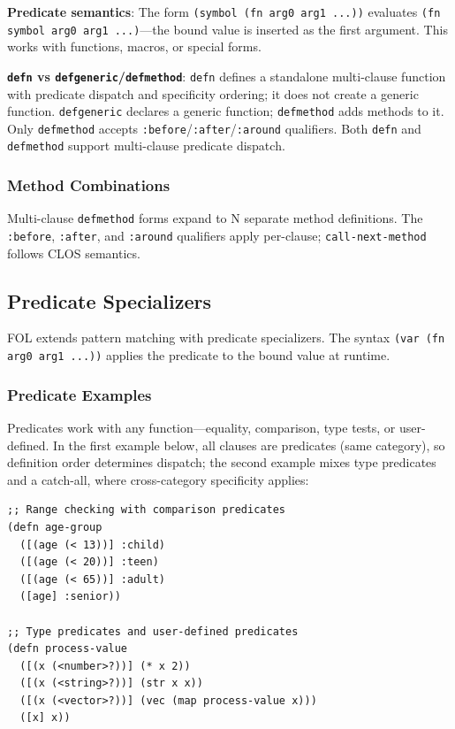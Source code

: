 \documentclass[sigconf,nonacm,review]{acmart}
\begin{document}
\textbf{Predicate semantics}: The form \texttt{(symbol (fn arg0 arg1 ...))} evaluates \texttt{(fn symbol arg0 arg1 ...)}---the bound value is inserted as the first argument. This works with functions, macros, or special forms.

\textbf{\texttt{defn} vs \texttt{defgeneric}/\texttt{defmethod}}: \texttt{defn} defines a standalone multi-clause function with predicate dispatch and specificity ordering; it does not create a generic function.
\texttt{defgeneric} declares a generic function; \texttt{defmethod} adds methods to it. Only \texttt{defmethod} accepts \texttt{:before}/\texttt{:after}/\texttt{:around} qualifiers. Both \texttt{defn} and \texttt{defmethod}
support multi-clause predicate dispatch.

\subsubsection{Method Combinations}

Multi-clause \texttt{defmethod} forms expand to N separate method definitions. The \texttt{:before}, \texttt{:after}, and \texttt{:around} qualifiers apply per-clause; \texttt{call-next-method} follows CLOS semantics.

\subsection{Predicate Specializers}

FOL extends pattern matching with predicate specializers. The syntax \texttt{(var (fn arg0 arg1 ...))} applies the predicate to the bound value at runtime.

\subsubsection{Predicate Examples}

Predicates work with any function---equality, comparison, type tests, or user-defined. In the first example below, all clauses are predicates (same category), so definition order determines dispatch; the second example
mixes type predicates and a catch-all, where cross-category specificity applies:

\begin{lstlisting}
;; Range checking with comparison predicates
(defn age-group
  ([(age (< 13))] :child)
  ([(age (< 20))] :teen)
  ([(age (< 65))] :adult)
  ([age] :senior))

;; Type predicates and user-defined predicates
(defn process-value
  ([(x (<number>?))] (* x 2))
  ([(x (<string>?))] (str x x))
  ([(x (<vector>?))] (vec (map process-value x)))
  ([x] x))
\end{lstlisting}
\end{document}
